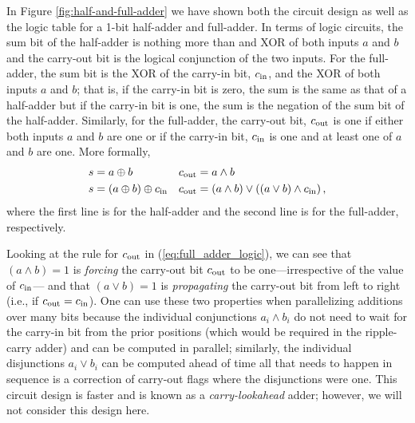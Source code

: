 In Figure \ref{fig:half-and-full-adder} we have shown both the circuit design as well as the logic table for a 1-bit half-adder and full-adder. In terms of logic circuits, the sum bit of the half-adder is nothing more than and XOR of both inputs $a$ and $b$ and the carry-out bit is the logical conjunction of the two inputs. For the full-adder, the sum bit is the XOR of the carry-in bit, $c_{\mathrm{in}}$, and the XOR of both inputs $a$ and $b$; that is, if the carry-in bit is zero, the sum is the same as that of a half-adder but if the carry-in bit is one, the sum is the negation of the sum bit of the half-adder. Similarly, for the full-adder, the carry-out bit, $c_{\mathrm{out}}$ is one if either both inputs $a$ and $b$ are one or if the carry-in bit, $c_{\mathrm{in}}$ is one and at least one of $a$ and $b$ are one. More formally,
\begin{align}
    s & = a \oplus b & c_{\mathrm{out}} & = a \land b \\
    s & = (a \oplus b) \oplus c_{\mathrm{in}} & c_{\mathrm{out}} & = (a \land b) \lor ((a \lor b) \land c_{\mathrm{in}}) \label{eq:full_adder_logic} \,,
\end{align}
where the first line is for the half-adder and the second line is for the full-adder, respectively.

Looking at the rule for $c_{\mathrm{out}}$ in (\ref{eq:full_adder_logic}), we can see that $(a \land b) = 1$ is {\em forcing} the carry-out bit $c_{\mathrm{out}}$ to be one---irrespective of the value of $c_{\mathrm{in}}$--- and that $(a \lor b) = 1$ is {\em propagating} the carry-out bit from left to right (i.e., if $c_{\mathrm{out}} = c_{\mathrm{in}}$). One can use these two properties when parallelizing additions over many bits because the individual conjunctions $a_i \land b_i$ do not need to wait for the carry-in bit from the prior positions (which would be required in the ripple-carry adder) and can be computed in parallel; similarly, the individual disjunctions $a_i \lor b_i$ can be computed ahead of time all that needs to happen in sequence is a correction of carry-out flags where the disjunctions were one. This circuit design is faster and is known as a {\em carry-lookahead} adder; however, we will not consider this design here.

